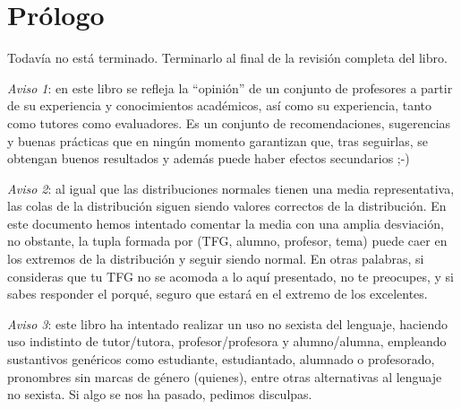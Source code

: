 \chapter{Prólogo}

Todavía no está terminado. Terminarlo al final de la revisión completa del libro.

\textit{Aviso 1}: en este libro se refleja la  “opinión” de un conjunto de profesores a partir de su experiencia y conocimientos académicos, así como su experiencia, tanto como tutores como evaluadores. Es un conjunto de recomendaciones, sugerencias y buenas prácticas que en ningún momento garantizan que, tras seguirlas, se obtengan buenos resultados y además puede haber efectos secundarios ;-) 

\textit{Aviso 2}: al igual que las distribuciones normales tienen una media representativa, las colas de la distribución siguen siendo valores correctos de la distribución. En este documento hemos intentado comentar la media con una amplia desviación, no obstante, la tupla formada por (TFG, alumno, profesor, tema) puede caer en los extremos de la distribución y seguir siendo normal. En otras palabras, si consideras que tu TFG no se acomoda a lo aquí presentado, no te preocupes, y si sabes responder el porqué, seguro que estará en el extremo de los excelentes. 

\textit{Aviso 3}: este libro ha intentado realizar un uso no sexista del lenguaje, haciendo uso indistinto de  tutor/tutora, profesor/profesora y alumno/alumna, empleando sustantivos genéricos como estudiante, estudiantado, alumnado o profesorado, pronombres sin marcas de género (quienes), entre otras alternativas al lenguaje no sexista. Si algo se nos ha pasado, pedimos disculpas.

